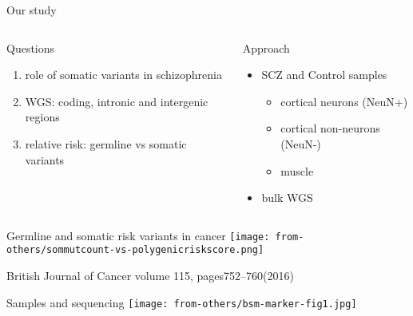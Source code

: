 \documentclass{beamer}
\begin{document}
\begin{frame}[label=our-study]{Our study}
\begin{columns}[t]
\begin{column}{0.5\textwidth}
Questions
\begin{enumerate}
\item role of somatic variants in schizophrenia
\item WGS: coding, intronic and intergenic regions
\item relative risk: germline vs somatic variants	
\end{enumerate}
\end{column}

\begin{column}{0.5\textwidth}
Approach
\begin{itemize}
\item SCZ and Control samples
	\begin{itemize}
		\item cortical neurons (NeuN+)
                \item cortical non-neurons (NeuN-)
                \item muscle
	\end{itemize}
\item bulk WGS
\end{itemize}
\end{column}
\end{columns}
\end{frame}

\begin{frame}{Germline and somatic risk variants in cancer}
\texttt{[image: from-others/sommutcount-vs-polygenicriskscore.png]}

\tiny
British Journal of Cancer volume 115, pages752–760(2016)
\end{frame}


\begin{frame}{Samples and sequencing}
\texttt{[image: from-others/bsm-marker-fig1.jpg]}
\end{frame}
\end{document}
